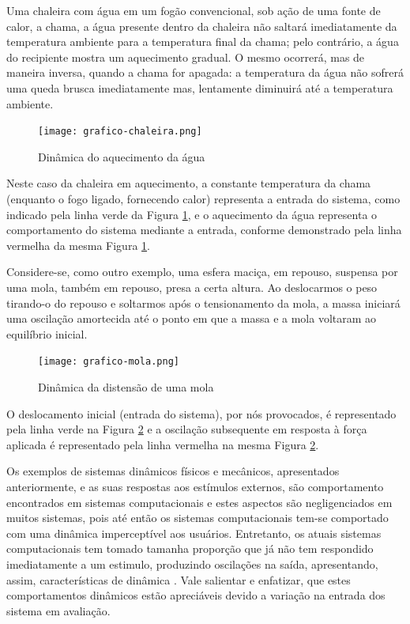 \begin{description}
	\item Uma chaleira com água em um fogão convencional, sob ação de uma fonte de calor, a chama, a água presente dentro da chaleira não saltará imediatamente da temperatura ambiente para a temperatura final da chama; pelo contrário, a água do recipiente mostra um aquecimento gradual. O mesmo ocorrerá, mas de maneira inversa, quando a chama for apagada: a temperatura da água não sofrerá uma queda brusca imediatamente mas, lentamente diminuirá até a temperatura ambiente.
	
	\begin{figure}[htb]
		\centering
		\texttt{[image: grafico-chaleira.png]}
		\caption{Dinâmica do aquecimento da água}
		\label{fig:chaleira}
	\end{figure}
	
	Neste caso da chaleira em aquecimento, a constante temperatura da chama (enquanto o fogo ligado, fornecendo calor) representa a entrada do sistema, como indicado pela linha verde da Figura \ref{fig:chaleira}, e o aquecimento da água representa o comportamento do sistema mediante a entrada, conforme demonstrado pela linha vermelha da mesma Figura \ref{fig:chaleira}. 
	
	\item Considere-se, como outro exemplo, uma esfera maciça, em repouso, suspensa por uma mola, também em repouso, presa a certa altura. Ao deslocarmos o peso tirando-o do repouso e soltarmos após o tensionamento da mola, a massa iniciará uma oscilação amortecida até o ponto em que a massa e a mola voltaram ao equilíbrio inicial.	
	
	\begin{figure}[!htb]
		\centering
		\texttt{[image: grafico-mola.png]}
		\caption{Dinâmica da distensão de uma mola}
		\label{fig:mola}		
	\end{figure}
	
	O deslocamento inicial (entrada do sistema), por nós provocados, é representado pela linha verde na Figura \ref{fig:mola} e a oscilação subsequente em resposta à força aplicada é representado pela linha vermelha na mesma Figura \ref{fig:mola}.
\end{description}

Os exemplos de sistemas dinâmicos físicos e mecânicos, apresentados anteriormente, e as suas respostas aos estímulos externos, são comportamento encontrados em sistemas computacionais e estes aspectos são negligenciados em muitos sistemas, pois até então os sistemas computacionais tem-se comportado com uma dinâmica imperceptível aos usuários. Entretanto, os atuais sistemas computacionais tem tomado tamanha proporção que já não tem respondido imediatamente a um estimulo, produzindo oscilações na saída, apresentando, assim, características de dinâmica \cite{Janert2013}. Vale salientar e enfatizar, que estes comportamentos dinâmicos estão apreciáveis devido a variação na entrada dos sistema em avaliação.

